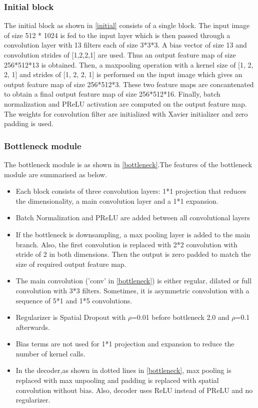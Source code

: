 \documentclass[a4paper, 12pt, oneside, BCOR1cm,toc=chapterentrywithdots]{scrbook}
\begin{document}
\subsubsection{Initial block}

The initial block as shown in \ref{initial} consists of a single block. The input image of size 512 * 1024 is fed to the input layer which is then passed through a convolution layer with 13 filters each of size 3*3*3. A bias vector of size 13 and convolution strides of [1,2,2,1] are used. Thus an output feature map of size 256*512*13 is obtained. Then, a maxpooling operation with a kernel size of [1, 2, 2, 1] and strides of [1, 2, 2, 1] is performed on the input image which gives an output feature map of size 256*512*3. These two feature maps are concantenated to obtain a final output feature map of size 256*512*16. Finally, batch normalization and PReLU activation are computed on the output feature map. The weights for convolution filter are initialized with Xavier initializer\cite{glorot2010understanding} and zero padding is used.  

\subsubsection{Bottleneck module}

The bottleneck module is as shown in \ref{bottleneck}.The features of the bottleneck module are summarised as below.

\begin{itemize}
	\item Each block consists of three convolution layers: 1*1 projection that reduces the dimensionality, a main convolution layer and a 1*1 expansion. 
	\item Batch Normalization  \cite{ioffe2015batch} and PReLU \cite{he2015delving} are added between all convolutional layers
	\item If the bottleneck is downsampling, a max pooling layer is added to the main branch. Also, the first convolution is replaced with 2*2 convolution with stride of 2 in both dimensions. Then the output is zero padded to match the size of required output feature map.
	\item The main convolution ('conv' in \ref{bottleneck}) is either regular, dilated or full convolution with 3*3 filters. Sometimes, it is asymmetric convolution with a sequence of 5*1 and 1*5 convolutions. 
	\item Regularizer is Spatial Dropout \cite{tompson2015efficient} with $\rho$=0.01 before bottleneck 2.0 and $\rho$=0.1 afterwards.
	\item Bias terms are not used for 1*1 projection and expansion to reduce the number of kernel calls. 
	\item In the decoder,as shown in dotted lines in \ref{bottleneck}, max pooling is replaced with max unpooling and padding is replaced with spatial convolution without bias. Also, decoder uses ReLU instead of PReLU and no regularizer.
\end{itemize}
\end{document}
